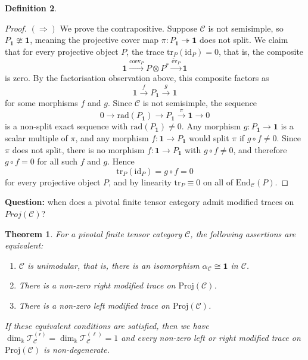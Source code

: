 \documentclass[11pt]{article}
\newcommand{\C}{\mathcal{C}}
\newtheorem{theorem}{Theorem}[section]
\theoremstyle{definition}
\newtheorem{definition}[theorem]{Definition}
\begin{document}
\begin{definition}
\begin{proof}
$(\Rightarrow)$ We prove the contrapositive. Suppose $\mathcal{C}$ is not semisimple,
so $P_{\mathbf{1}} \ncong \mathbf{1}$, meaning the projective cover map
$\pi : P_{\mathbf{1}} \twoheadrightarrow \mathbf{1}$ does not split. We claim that for
every projective object $P$, the trace $\mathrm{tr}_{P}(\mathrm{id}_{P}) = 0$, that is,
the composite
\[
\mathbf{1}
\xrightarrow{\mathrm{coev}_{P}}
P \otimes P^{*}
\xrightarrow{\widetilde{\mathrm{ev}}_{P}}
\mathbf{1}
\]
is zero. By the factorisation observation above, this composite factors as
\[
\mathbf{1} \xrightarrow{f} P_{\mathbf{1}} \xrightarrow{g} \mathbf{1}
\]
for some morphisms $f$ and $g$. Since $\mathcal{C}$ is not semisimple, the sequence
\[
0
\to
\mathrm{rad}(P_{\mathbf{1}})
\to
P_{\mathbf{1}}
\xrightarrow{\pi}
\mathbf{1}
\to 0
\]
is a non-split exact sequence with $\mathrm{rad}(P_{\mathbf{1}}) \neq 0$. Any morphism
$g : P_{\mathbf{1}} \to \mathbf{1}$ is a scalar multiple of $\pi$, and any morphism
$f : \mathbf{1} \to P_{\mathbf{1}}$ would split $\pi$ if $g \circ f \neq 0$. Since $\pi$
does not split, there is no morphism $f : \mathbf{1} \to P_{\mathbf{1}}$ with
$g \circ f \neq 0$, and therefore $g \circ f = 0$ for all such $f$ and $g$. Hence
\[
\mathrm{tr}_{P}(\mathrm{id}_{P}) = g \circ f = 0
\]
for every projective object $P$, and by linearity
$\mathrm{tr}_{P} \equiv 0$ on all of $\mathrm{End}_{\mathcal{C}}(P)$.
\end{proof}




\textbf{Question:} when does a pivotal finite tensor category admit modified traces on $Proj (\C)$? 




\begin{theorem}
For a pivotal finite tensor category $\mathcal{C}$, the following assertions are
equivalent:
\begin{enumerate}
    \item $\mathcal{C}$ is unimodular, that is, there is an isomorphism $\alpha_{\mathcal{C}} \cong \mathbf{1}$ in $\mathcal{C}$.
    \item There is a non-zero right modified trace on $\mathrm{Proj}(\mathcal{C})$.
    \item There is a non-zero left modified trace on $\mathrm{Proj}(\mathcal{C})$.
\end{enumerate}
If these equivalent conditions are satisfied, then we have $\dim_{\Bbbk} \mathcal{T}_{\mathcal{C}}^{(r)} = \dim_{\Bbbk} \mathcal{T}_{\mathcal{C}}^{(\ell)} = 1$
and every non-zero left or right modified trace on $\mathrm{Proj}(\mathcal{C})$ is non-degenerate.
\end{theorem}



\end{definition}
\end{document}

